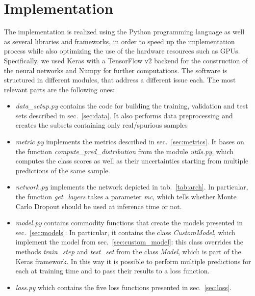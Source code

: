 \documentclass[11pt,twoside,a4paper]{article}
\begin{document}
\section{Implementation}
\label{sec:implementation}
The implementation is realized using the Python programming language as well as several libraries and frameworks, in order to speed up the implementation process while also optimizing the use of the hardware resources such as GPUs. Specifically, we used Keras with a TensorFlow v2 backend for the construction of the neural networks and Numpy for further computations.\newline
The software is structured in different modules, that address a different issue each. The most relevant parts are the following ones:
\begin{itemize}
\item \emph{data\_setup.py} contains the code for building the training, validation and test sets described in sec.~\ref{sec:data}. It also performs data preprocessing and creates the subsets containing only real/spurious samples
\item \emph{metric.py} implements the metrics described in sec.~\ref{sec:metrics}. It bases on the function \emph{compute\_pred\_distribution} from the module \emph{utils.py}, which computes the class scores as well as their uncertainties starting from multiple predictions of the same sample.
\item \emph{network.py} implements the network depicted in tab.~\ref{tab:arch}. In particular, the function \emph{get\_layers} takes a parameter \emph{mc}, which tells whether Monte Carlo Dropout should be used at inference time or not.
\item \emph{model.py} contains commodity functions that create the models presented in sec.~\ref{sec:models}. In particular, it contains the class \emph{CustomModel}, which implement the model from sec.~\ref{sec:custom_model}: this class overrides the methods \emph{train\_step} and \emph{test\_set} from the class \emph{Model}, which is part of the Keras framework. In this way it is possible to perform multiple predictions for each at training time and to pass their results to a loss function.
\item \emph{loss.py} which contains the five loss functions presented in sec.~\ref{sec:loss}.
\end{itemize}
\end{document}
